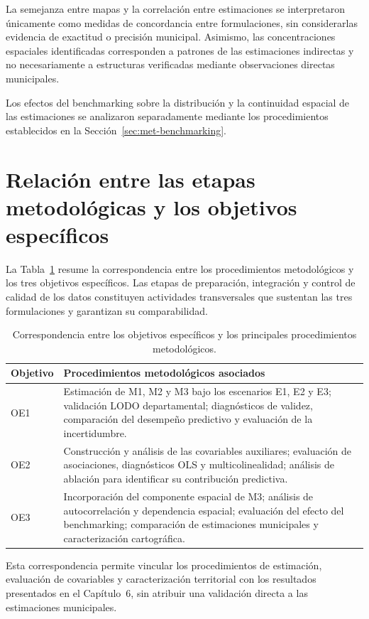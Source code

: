 La semejanza entre mapas y la correlación entre estimaciones se interpretaron únicamente como medidas de concordancia entre formulaciones, sin considerarlas evidencia de exactitud o precisión municipal. Asimismo, las concentraciones espaciales identificadas corresponden a patrones de las estimaciones indirectas y no necesariamente a estructuras verificadas mediante observaciones directas municipales.

Los efectos del benchmarking sobre la distribución y la continuidad espacial de las estimaciones se analizaron separadamente mediante los procedimientos establecidos en la Sección~\ref{sec:met-benchmarking}.

\section{Relación entre las etapas metodológicas y los objetivos específicos}
\label{sec:met-objetivos}

La Tabla~\ref{tab:etapas-objetivos} resume la correspondencia entre los procedimientos metodológicos y los tres objetivos específicos. Las etapas de preparación, integración y control de calidad de los datos constituyen actividades transversales que sustentan las tres formulaciones y garantizan su comparabilidad.

\begin{table}[!htbp]
\centering
\footnotesize
\caption{Correspondencia entre los objetivos específicos y los principales procedimientos metodológicos.}
\label{tab:etapas-objetivos}
\renewcommand{\arraystretch}{1.15}
\setlength{\tabcolsep}{5pt}

\begin{tabular}{p{1.8cm} p{10.5cm}}
\hline
Objetivo & Procedimientos metodológicos asociados \\
\hline

OE1 &
Estimación de M1, M2 y M3 bajo los escenarios E1, E2 y E3; validación LODO departamental; diagnósticos de validez, comparación del desempeño predictivo y evaluación de la incertidumbre. \\

\hline

OE2 &
Construcción y análisis de las covariables auxiliares; evaluación de asociaciones, diagnósticos OLS y multicolinealidad; análisis de ablación para identificar su contribución predictiva. \\

\hline

OE3 &
Incorporación del componente espacial de M3; análisis de autocorrelación y dependencia espacial; evaluación del efecto del benchmarking; comparación de estimaciones municipales y caracterización cartográfica. \\

\hline
\end{tabular}
\end{table}

Esta correspondencia permite vincular los procedimientos de estimación, evaluación de covariables y caracterización territorial con los resultados presentados en el Capítulo~6, sin atribuir una validación directa a las estimaciones municipales.

